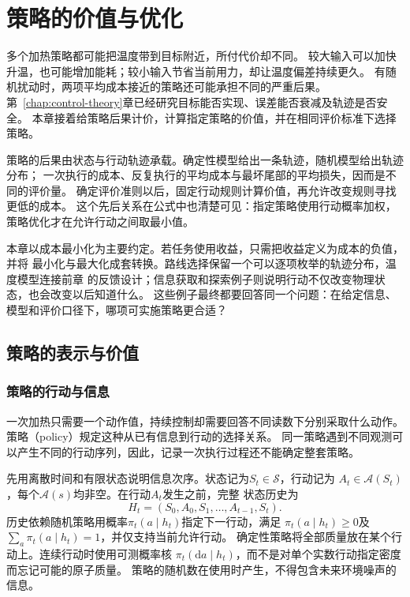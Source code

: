 \chapter{策略的价值与优化}
\label{chap:decision-theory-and-dynamic-risk}
\label{chap:policy-value-and-optimization}

多个加热策略都可能把温度带到目标附近，所付代价却不同。
较大输入可以加快升温，也可能增加能耗；较小输入节省当前用力，却让温度偏差持续更久。
有随机扰动时，两项平均成本接近的策略还可能承担不同的严重后果。
第~\ref{chap:control-theory}章已经研究目标能否实现、误差能否衰减及轨迹是否安全。
本章接着给策略后果计价，计算指定策略的价值，并在相同评价标准下选择策略。

策略的后果由状态与行动轨迹承载。确定性模型给出一条轨迹，随机模型给出轨迹分布；
一次执行的成本、反复执行的平均成本与最坏尾部的平均损失，因而是不同的评价量。
确定评价准则以后，固定行动规则计算价值，再允许改变规则寻找更低的成本。
这个先后关系在公式中也清楚可见：指定策略使用行动概率加权，策略优化才在允许行动之间取最小值。

本章以成本最小化为主要约定。若任务使用收益，只需把收益定义为成本的负值，并将
最小化与最大化成套转换。路线选择保留一个可以逐项枚举的轨迹分布，温度模型连接前章
的反馈设计；信息获取和探索例子则说明行动不仅改变物理状态，也会改变以后知道什么。
这些例子最终都要回答同一个问题：在给定信息、模型和评价口径下，哪项可实施策略更合适？

\section{策略的表示与价值}
\label{sec:policy-representation-and-value}

\subsection{策略的行动与信息}
\label{sec:policy-actions-and-information}

一次加热只需要一个动作值，持续控制却需要回答不同读数下分别采取什么动作。
策略（policy）规定这种从已有信息到行动的选择关系。
同一策略遇到不同观测可以产生不同的行动序列，因此，记录一次执行过程还不能确定整套策略。

先用离散时间和有限状态说明信息次序。状态记为$S_t\in\mathcal S$，行动记为
$A_t\in\mathcal A(S_t)$，每个$\mathcal A(s)$均非空。在行动$A_t$发生之前，完整
状态历史为
\[
  H_t=(S_0,A_0,S_1,\ldots,A_{t-1},S_t).
\]
历史依赖随机策略用概率$\pi_t(a\mid h_t)$指定下一行动，满足
$\pi_t(a\mid h_t)\geq0$及$\sum_a\pi_t(a\mid h_t)=1$，并仅支持当前允许行动。
确定性策略将全部质量放在某个行动上。连续行动时使用可测概率核
$\pi_t(\mathrm da\mid h_t)$，而不是对单个实数行动指定密度而忘记可能的原子质量。
策略的随机数在使用时产生，不得包含未来环境噪声的信息。

